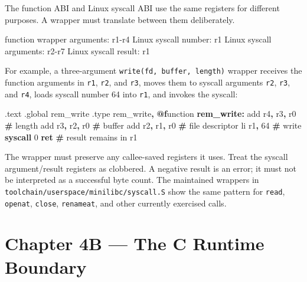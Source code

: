 \documentclass[
  oneside,
  openany]{book}
\newenvironment{Shaded}{\begin{snugshade}}{\end{snugshade}}
\newcommand{\BuiltInTok}[1]{#1}
\newcommand{\ControlFlowTok}[1]{\textcolor[rgb]{0.13,0.29,0.53}{\textbf{#1}}}
\newcommand{\DataTypeTok}[1]{\textcolor[rgb]{0.13,0.29,0.53}{#1}}
\newcommand{\DecValTok}[1]{\textcolor[rgb]{0.00,0.00,0.81}{#1}}
\newcommand{\FunctionTok}[1]{\textcolor[rgb]{0.13,0.29,0.53}{\textbf{#1}}}
\newcommand{\NormalTok}[1]{#1}
\newcommand{\OperatorTok}[1]{\textcolor[rgb]{0.81,0.36,0.00}{\textbf{#1}}}
\begin{document}
The function ABI and Linux syscall ABI use the same registers for
different purposes. A wrapper must translate between them deliberately.

\begin{Shaded}
\begin{Highlighting}[]
\NormalTok{function wrapper arguments: r1{-}r4}
\NormalTok{Linux syscall number:       r1}
\NormalTok{Linux syscall arguments:    r2{-}r7}
\NormalTok{Linux syscall result:       r1}
\end{Highlighting}
\end{Shaded}

For example, a three-argument \texttt{write(fd,\ buffer,\ length)}
wrapper receives the function arguments in \texttt{r1}, \texttt{r2}, and
\texttt{r3}, moves them to syscall arguments \texttt{r2}, \texttt{r3},
and \texttt{r4}, loads syscall number 64 into \texttt{r1}, and invokes
the syscall:

\begin{Shaded}
\begin{Highlighting}[]
\NormalTok{.text}
\NormalTok{.global rem\_write}
\NormalTok{.type rem\_write}\OperatorTok{,} \FunctionTok{@f}\NormalTok{unction}
\FunctionTok{rem\_write:}
        \BuiltInTok{add}\NormalTok{  r4}\OperatorTok{,}\NormalTok{ r3}\OperatorTok{,}\NormalTok{ r0       }\OperatorTok{\#}\NormalTok{ length}
        \BuiltInTok{add}\NormalTok{  r3}\OperatorTok{,}\NormalTok{ r2}\OperatorTok{,}\NormalTok{ r0       }\OperatorTok{\#}\NormalTok{ buffer}
        \BuiltInTok{add}\NormalTok{  r2}\OperatorTok{,}\NormalTok{ r1}\OperatorTok{,}\NormalTok{ r0       }\OperatorTok{\#} \DataTypeTok{file}\NormalTok{ descriptor}
\NormalTok{        li   r1}\OperatorTok{,} \DecValTok{64}           \OperatorTok{\#}\NormalTok{ write}
        \ControlFlowTok{syscall} \DecValTok{0}
        \ControlFlowTok{ret}                   \OperatorTok{\#}\NormalTok{ result remains in r1}
\end{Highlighting}
\end{Shaded}

The wrapper must preserve any callee-saved registers it uses. Treat the
syscall argument/result registers as clobbered. A negative result is an
error; it must not be interpreted as a successful byte count. The
maintained wrappers in \texttt{toolchain/userspace/minilibc/syscall.S}
show the same pattern for \texttt{read}, \texttt{openat},
\texttt{close}, \texttt{renameat}, and other currently exercised calls.

\hypertarget{chapter-4b-the-c-runtime-boundary}{%
\chapter{Chapter 4B --- The C Runtime
Boundary}\label{chapter-4b-the-c-runtime-boundary}}
\end{document}
